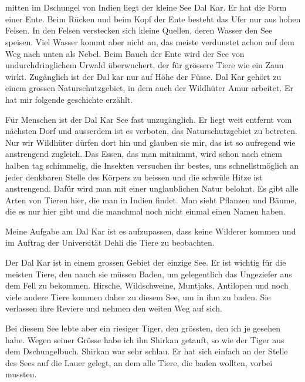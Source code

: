 \chapter*{}
\lettrine[lines=3]{\color{DeepPink}{M}}{}
\begin{sffamily}
mitten im Dschungel von Indien liegt der kleine See Dal Kar. Er hat die Form einer Ente. Beim Rücken und beim Kopf der Ente besteht das Ufer nur aus hohen Felsen. In den Felsen verstecken sich kleine Quellen, deren Wasser den See speisen. Viel Wasser kommt aber nicht an, das meiste verdunstet achon auf dem Weg nach unten als Nebel. Beim Bauch der Ente wird der See von undurchdringlichem Urwald überwuchert, der für grössere Tiere wie ein Zaun wirkt. Zugänglich ist der Dal kar nur auf Höhe der Füsse. Dal Kar gehört zu einem grossen Naturschutzgebiet, in dem auch der Wildhüter Amur arbeitet. Er hat mir folgende geschichte erzählt.
\end{sffamily}

Für Menschen ist der Dal Kar See fast unzugänglich. Er liegt weit entfernt vom nächsten Dorf und ausserdem ist es verboten, das Naturschutzgebiet zu betreten. Nur wir Wildhüter dürfen dort hin und glauben sie mir, das ist so aufregend wie anstrengend zugleich. Das Essen, das man mitnimmt, wird schon nach einem halben tag schimmelig, die Insekten versuchen ihr bestes, uns schnellstmöglich an jeder denkbaren Stelle des Körpers zu beissen und die schwüle Hitze ist anstrengend. Dafür wird man mit einer unglaublichen Natur belohnt. Es gibt alle Arten von Tieren hier, die man in Indien findet. Man sieht Pflanzen und Bäume, die es nur hier gibt und die manchmal noch nicht einmal einen Namen haben.

Meine Aufgabe am Dal Kar ist es aufzupassen, dass keine Wilderer kommen und im Auftrag der Universität Dehli die Tiere zu beobachten.

Der Dal Kar ist in einem grossen Gebiet der einzige See. Er ist wichtig für die meisten Tiere, den nauch sie müssen Baden, um gelegentlich das Ungeziefer aus dem Fell zu bekommen. Hirsche, Wildschweine, Muntjaks, Antilopen und noch viele andere Tiere kommen daher zu diesem See, um in ihm zu baden. Sie verlassen ihre Reviere und nehmen den weiten Weg auf sich.


Bei diesem See lebte aber ein riesiger Tiger, den grössten, den ich je gesehen habe. Wegen seiner Grösse habe ich ihn Shirkan getauft, so wie der Tiger aus dem Dschungelbuch. Shirkan war sehr schlau. Er hat sich einfach an der Stelle des Sees auf die Lauer gelegt, an dem alle Tiere, die baden wollten, vorbei mussten. 

